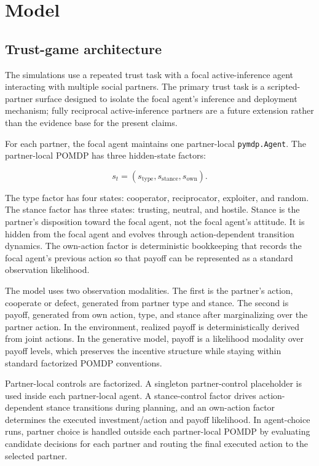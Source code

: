 \section{Model}

\subsection{Trust-game architecture}

The simulations use a repeated trust task with a focal active-inference agent interacting with multiple social partners. The primary trust task is a scripted-partner surface designed to isolate the focal agent's inference and deployment mechanism; fully reciprocal active-inference partners are a future extension rather than the evidence base for the present claims.

For each partner, the focal agent maintains one partner-local \texttt{pymdp.Agent}. The partner-local POMDP has three hidden-state factors:

\begin{equation}
 s_t = (s_{\mathrm{type}}, s_{\mathrm{stance}}, s_{\mathrm{own}}).
\end{equation}

The type factor has four states: cooperator, reciprocator, exploiter, and random. The stance factor has three states: trusting, neutral, and hostile. Stance is the partner's disposition toward the focal agent, not the focal agent's attitude. It is hidden from the focal agent and evolves through action-dependent transition dynamics. The own-action factor is deterministic bookkeeping that records the focal agent's previous action so that payoff can be represented as a standard observation likelihood.

The model uses two observation modalities. The first is the partner's action, cooperate or defect, generated from partner type and stance. The second is payoff, generated from own action, type, and stance after marginalizing over the partner action. In the environment, realized payoff is deterministically derived from joint actions. In the generative model, payoff is a likelihood modality over payoff levels, which preserves the incentive structure while staying within standard factorized POMDP conventions.

Partner-local controls are factorized. A singleton partner-control placeholder is used inside each partner-local agent. A stance-control factor drives action-dependent stance transitions during planning, and an own-action factor determines the executed investment/action and payoff likelihood. In agent-choice runs, partner choice is handled outside each partner-local POMDP by evaluating candidate decisions for each partner and routing the final executed action to the selected partner.

